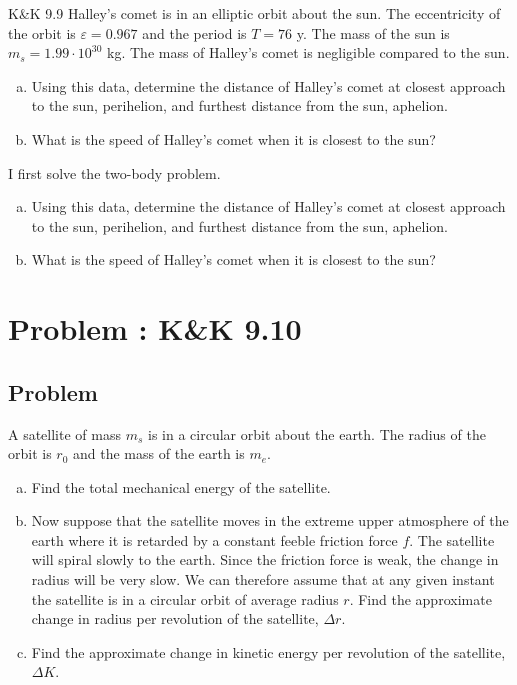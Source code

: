 \documentclass[solutions]{esg8012pset}
\begin{document}
\begin{problem}{K\&K 9.9}
  Halley's comet is in an elliptic orbit about the sun. The eccentricity of the orbit is $\varepsilon = 0.967$ and the period is $T = 76$ y. The mass of the sun is $m_s = 1.99 \cdot 10^{30}$ kg.  The mass of Halley's comet is negligible compared to the sun.
  \begin{enumerate}[(a)]
    \item Using this data, determine the distance of Halley's comet at closest approach to the sun, perihelion, and furthest distance from the sun, aphelion.
    \item What is the speed of Halley's comet when it is closest to the sun?
  \end{enumerate}
\end{problem}
\begin{solution}
I first solve the two-body problem.

% 
%
%


\begin{enumerate}[(a)]
  \item Using this data, determine the distance of Halley's comet at closest approach to the sun, perihelion, and furthest distance from the sun, aphelion.
  \item What is the speed of Halley's comet when it is closest to the sun?
\end{enumerate}
\section{Problem \thesection: K\&K 9.10}
\subsection{Problem}
  A satellite of mass $m_s$ is in a circular orbit about the earth. The radius of the orbit is $r_0$ and the mass of the earth is $m_e$.
  \begin{enumerate}[(a)]
    \item Find the total mechanical energy of the satellite.
    \item Now suppose that the satellite moves in the extreme upper atmosphere of the earth where it is retarded by a constant feeble friction force $f$. The satellite will spiral slowly to the earth. Since the friction force is weak, the change in radius will be very slow. We can therefore assume that at any given instant the satellite is in a circular orbit of average radius $r$. Find the approximate change in radius per revolution of the satellite, $\Delta r$.
    \item Find the approximate change in kinetic energy per revolution of the satellite, $\Delta K$.
  \end{enumerate}

\end{solution}
\end{document}

